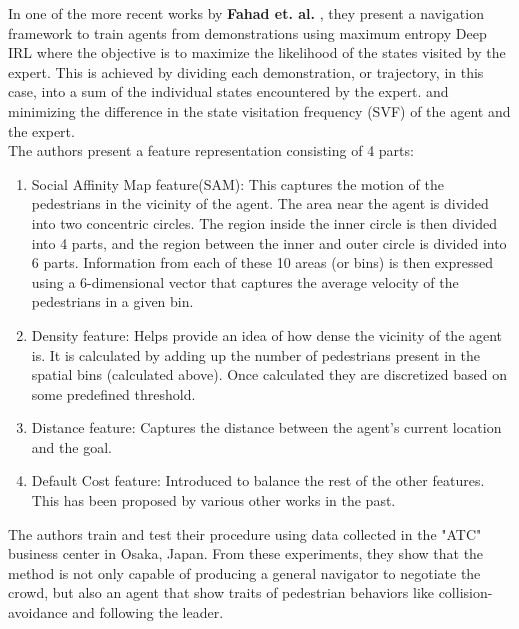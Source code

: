 In one of the more recent works by \textbf{Fahad et. al.} \cite{fahad_learning_2018}, they present a navigation framework to train agents from demonstrations using maximum entropy Deep IRL where the objective is to maximize the likelihood of the states visited by the expert.
This is achieved by dividing each demonstration, or trajectory, in this case, into a sum of the individual states encountered by the expert. and minimizing the difference in the state visitation frequency (SVF) of the agent and the expert.\\
The authors present a feature representation consisting of 4 parts:
\begin{enumerate}
    \item Social Affinity Map feature(SAM): This captures the motion of the pedestrians in the vicinity of the agent. The area near the agent is divided into two concentric circles. The region inside the inner circle is then divided into 4 parts, and the region between the inner and outer circle is divided into 6 parts.
    Information from each of these 10 areas (or bins) is then expressed using a 6-dimensional vector that captures the average velocity of the pedestrians in a given bin. 
    \item Density feature: Helps provide an idea of how dense the vicinity of the agent is. It is calculated by adding up the number of pedestrians present in the spatial bins (calculated above). Once calculated they are discretized based on some predefined threshold.
    \item Distance feature: Captures the distance between the agent's current location and the goal.
    \item Default Cost feature: Introduced to balance the rest of the other features. This has been proposed by various other works in the past.
    
\end{enumerate}
The authors train and test their procedure using data collected in the "ATC" business center in Osaka, Japan.
From these experiments, they show that the method is not only capable of producing a general navigator to negotiate the crowd, but also an agent that show traits of pedestrian behaviors like collision-avoidance and following the leader.


